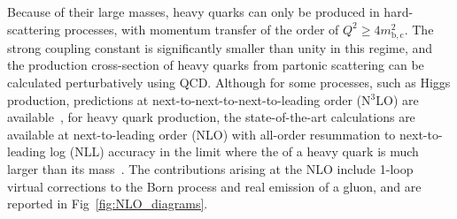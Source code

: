 Because of their large masses, heavy quarks can only be produced in hard-scattering processes, with momentum transfer of the order of $Q^2 \geq 4m^2_\mathrm{b,c}$. The strong coupling constant is significantly smaller than unity in this regime, and the production cross-section of heavy quarks from partonic scattering can be calculated perturbatively using QCD. Although for some processes, such as Higgs production, predictions at next-to-next-to-next-to-leading order (N$^3$LO) are available~\cite{Anastasiou:2015vya, Anastasiou:2016cez}, for heavy quark production, the state-of-the-art calculations are available at next-to-leading order (NLO) with all-order resummation to next-to-leading log (NLL) accuracy in the limit where the \pt of a heavy quark is much larger than its mass~\cite{Cacciari:1998it}. The contributions arising at the NLO include 1-loop virtual corrections to the Born process and real emission of a gluon, and are reported in Fig~\ref{fig:NLO_diagrams}.

